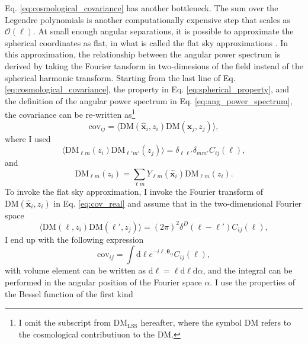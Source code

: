 Eq. \ref{eq:cosmological_covariance} has another bottleneck. The sum over the Legendre polynomials is another computationally expensive step that scales as  $\mathcal{O}(\ell)$. At small enough angular separations, it is possible to approximate the spherical coordinates as flat, in what is called the flat sky approximations \citep{kaiser1992weak}. In this approximation, the relationship between the angular power spectrum is derived by taking the Fourier tansform in two-dimesions of the field instead of the spherical harmonic transform. Starting from the last line of Eq. \ref{eq:cosmological_covariance}, the property in Eq. \ref{eq:spherical_property}, and the definition of the angular power spectrum in Eq. \ref{eq:ang_power_spectrum}, the covariance can be re-written as\footnote{I omit the subscript from $\mathrm{DM}_\mathrm{LSS}$ hereafter, where the symbol $\mathrm{DM}$ refers to the cosmological contributiuon to the DM.}
\begin{equation} \label{eq:cov_real}
    \mathrm{cov}_{ij} = \langle \mathrm{DM}(\mathbf{\hat{x}}_i, z_i) \mathrm{DM}(\mathbf{\hat{x}}_j, z_j)\rangle,
\end{equation}
where I used 
\begin{equation}
    \langle \mathrm{DM}_{\ell m}(z_i) \mathrm{DM}_{\ell' m'}(z_j)\rangle = \delta_{\ell \ell'} \delta_{m m'}C_{ij}(\ell),
\end{equation}
and
\begin{equation}
    \mathrm{DM}_{\ell m}(z_i) = \sum_{\ell m}   Y_{\ell m}(\mathbf{\hat{x}}_i) \mathrm{DM}_{\ell m}(z_i).
\end{equation}
To invoke the flat sky approximation, I invoke the Fourier transform of $ \mathrm{DM}(\mathbf{\hat{x}}_i, z_i)$ in Eq. \ref{eq:cov_real} and assume that in the two-dimensional Fourier space
\begin{equation}
     \langle \mathrm{DM}(\ell, z_i) \mathrm{DM}(\ell', z_j)\rangle = \left(2\pi\right)^2 \delta^{D}(\ell - \ell') C_{ij}(\ell),
\end{equation}
I end up with the following expression 
\begin{equation}
    \mathrm{cov}_{ij} = \int \mathrm{d} \boldsymbol{\ell} e^{-i\boldsymbol{\ell}. \boldsymbol{\theta}_{ij}} C_{ij}(\ell),
\end{equation}
with volume element can be written as $\mathrm{d}\boldsymbol{\ell} = \ell \mathrm{d}\ell \mathrm{d}\alpha$, and the integral can be performed in the angular position of the Fourier space $\alpha$. I use the properties of the Bessel function of the first kind
